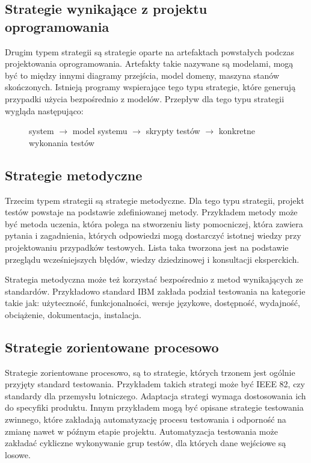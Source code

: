 \subsection{Strategie wynikające z projektu oprogramowania}
Drugim typem strategii są strategie oparte na artefaktach powstałych podczas projektowania oprogramowania. Artefakty takie nazywane są modelami, mogą być to między innymi diagramy przejścia, model domeny, maszyna stanów skończonych. Istnieją programy wspierające tego typu strategie, które generują przypadki użycia bezpośrednio z modelów. Przepływ dla tego typu strategii wygląda następująco: 
\begin{figure}[h!]
  \begin{center}
   system $\rightarrow$  model systemu $\rightarrow$ skrypty testów  $\rightarrow$  konkretne wykonania testów 
  \end{center}
\end{figure}
     
  
\subsection{Strategie metodyczne}
Trzecim typem strategii są strategie metodyczne. Dla tego typu strategii, projekt testów powstaje na podstawie zdefiniowanej metody. Przykładem metody może być metoda uczenia, która polega na stworzeniu listy pomocniczej, która zawiera pytania i zagadnienia, których odpowiedzi mogą dostarczyć istotnej wiedzy przy projektowaniu przypadków testowych. Lista taka tworzona jest na podstawie przeglądu wcześniejszych błędów, wiedzy dziedzinowej i konsultacji eksperckich. 

Strategia metodyczna może też korzystać bezpośrednio z metod wynikających ze standardów. Przykładowo standard IBM\cite{IBM}  zakłada podział testowania na kategorie takie jak: użyteczność, funkcjonalności, wersje językowe, dostępność, wydajność, obciążenie, dokumentacja, instalacja.
\subsection{Strategie zorientowane procesowo}
Strategie zorientowane procesowo, są to strategie, których trzonem jest ogólnie przyjęty standard testowania. Przykładem takich strategi może być IEEE 82, czy standardy dla przemysłu lotniczego. Adaptacja strategi wymaga dostosowania ich do specyfiki produktu. Innym przykładem mogą być opisane strategie testowania zwinnego, które zakładają automatyzację procesu testowania i odporność na zmianę nawet w późnym etapie projektu. Automatyzacja testowania może zakładać cykliczne wykonywanie grup testów, dla których dane wejściowe są losowe.
